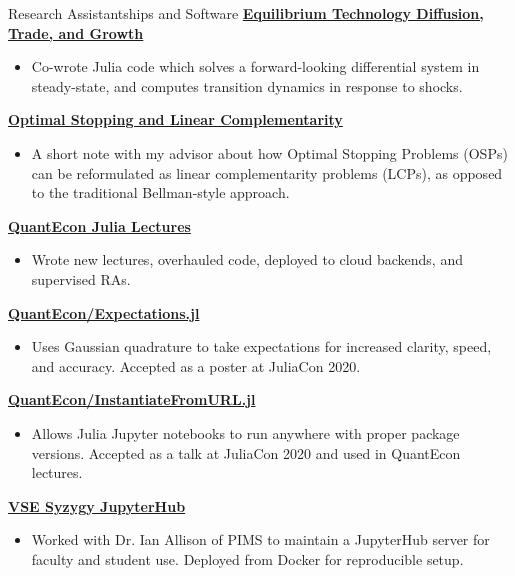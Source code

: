 \documentclass{resume} %
\begin{document}
\begin{rSection}{Research Assistantships and Software}
    {\bf \href{https://github.com/jlperla/PerlaTonettiWaugh.jl}{Equilibrium Technology Diffusion, Trade, and Growth}} %
    \begin{itemize}
        \item Co-wrote Julia code which solves a forward-looking differential system in steady-state, and computes transition dynamics in response to shocks.
    \end{itemize}

    {\bf \href{https://notes.quantecon.org/submission/5c832d2be7b4c5000f4c8e48}{Optimal Stopping and Linear Complementarity}} %
    \begin{itemize}
        \item A short note with my advisor about how Optimal Stopping Problems (OSPs) can be reformulated as linear complementarity problems (LCPs), as opposed to the traditional Bellman-style approach.
    \end{itemize}

    {\bf \href{https://julia.quantecon.org}{QuantEcon Julia Lectures}} %
    \begin{itemize}
        \item Wrote new lectures, overhauled code, deployed to cloud backends, and supervised RAs.
    \end{itemize}

    {\bf \href{https://github.com/quantecon/Expectations.jl}{QuantEcon/Expectations.jl}} %
    \begin{itemize}
        \item Uses Gaussian quadrature to take expectations for increased clarity, speed, and accuracy. Accepted as a poster at JuliaCon 2020.
    \end{itemize}

    {\bf \href{https://github.com/quantecon/InstantiateFromURL.jl}{QuantEcon/InstantiateFromURL.jl}} %
    \begin{itemize}
        \item Allows Julia Jupyter notebooks to run anywhere with proper package versions. Accepted as a talk at JuliaCon 2020 and used in QuantEcon lectures.
    \end{itemize}

    {\bf \href{https://vse.syzygy.ca}{VSE Syzygy JupyterHub}} %
    \begin{itemize}
        \item Worked with Dr. Ian Allison of PIMS to maintain a JupyterHub server for faculty and student use. Deployed from Docker for reproducible setup.
    \end{itemize}
    
    

\end{rSection}
\end{document}
